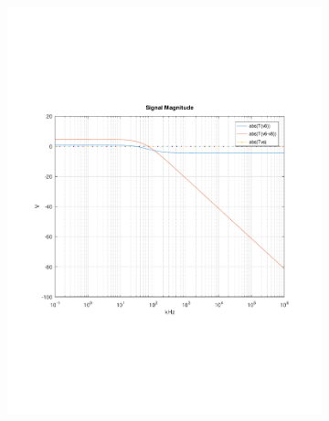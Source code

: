 \begin{figure}[h]
  \centering
  \begin{subfigure}{0.23\textwidth}
    \includegraphics[width=\linewidth, clip]{../mat/Transmagnitude.pdf}
  \end{subfigure}
  \begin{subfigure}{0.23\textwidth}

\end{subfigure}
\end{figure}
